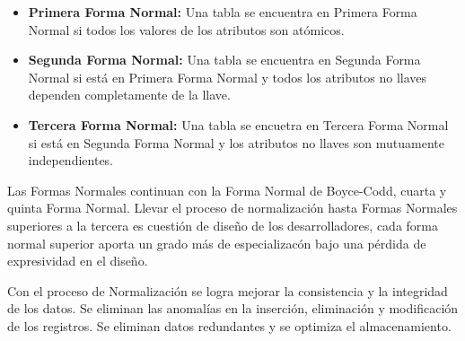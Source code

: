 \begin{itemize}
    \item \textbf{Primera Forma Normal:} Una tabla se encuentra en Primera Forma Normal si todos los valores de los atributos
        son at\'omicos. 

    \item \textbf{Segunda Forma Normal:} Una tabla se encuentra en Segunda Forma Normal si est\'a en Primera Forma Normal
        y todos los atributos no llaves dependen completamente de la llave.

    \item \textbf{Tercera Forma Normal:} Una tabla se encuetra en Tercera Forma Normal si est\'a en Segunda Forma Normal 
        y los atributos no llaves son mutuamente independientes.
\end{itemize}

Las Formas Normales continuan con la Forma Normal de Boyce-Codd, cuarta y quinta Forma Normal. Llevar el proceso 
de normalizaci\'on hasta Formas Normales superiores a la tercera es cuesti\'on de diseño de los desarrolladores, cada forma 
normal superior aporta un grado m\'as de especializac\'on bajo una p\'erdida de expresividad en el diseño.

Con el proceso de Normalización se logra mejorar la consistencia y la integridad de los datos. Se eliminan las anomal\'ias 
en la inserción, eliminaci\'on y modificación de los registros. Se eliminan datos redundantes y se optimiza el almacenamiento.

